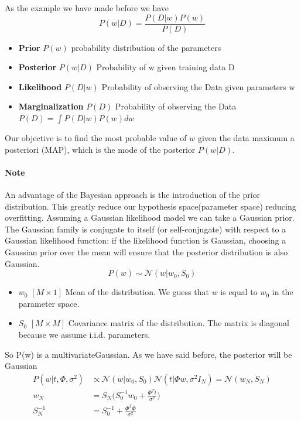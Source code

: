 \documentclass[../main.tex]{subfiles}
\begin{document}
As the example we have made before we have
\begin{equation*}
    P(w|D) = \frac{P(D|w)P(w)}{P(D)}
\end{equation*}
\begin{itemize}
    \item \textbf{Prior} $P(w)$ probability distribution of the parameters
    \item \textbf{Posterior} $P(w|D)$ Probability of w given training data D
    \item \textbf{Likelihood} $P(D|w)$ Probability of observing the Data given parameters w
    \item \textbf{Marginalization} $P(D)$ Probability of observing the Data $P(D)=\int P(D|w)P(w)dw$
\end{itemize}
Our objective is to find the most probable value of $w$ given the data maximum a
posteriori (MAP), which is the mode of the posterior $P(w|D)$.

\paragraph{Note} An advantage of the Bayesian approach is the introduction of the prior distribution. This greatly reduce our hypothesis space(parameter space) reducing overfitting.
Assuming a Gaussian likelihood model we can take a Gaussian prior.
The Gaussian family is conjugate to itself (or self-conjugate) with respect to a Gaussian likelihood function: if the likelihood function is Gaussian, choosing a Gaussian prior over the mean will ensure that the posterior distribution is also Gaussian.
\begin{equation}
    P(w) \sim \mathcal{N} (w|w_0, S_0)
\end{equation}
\begin{itemize}
    \item $w_0$ $[M \times 1]$ Mean of the distribution. We guess that $w$ is equal to $w_0$ in the parameter space.
    \item $S_0$ $[M \times M]$ Covariance matrix of the distribution. The matrix is diagonal because we assume i.i.d. parameters.
\end{itemize}
So P(w) is a multivariate\footnotemark Gaussian.
As we have said before, the posterior will be Gaussian
\begin{align*}
    P(w|t, \Phi, \sigma^2) & \propto \mathcal{N} (w|w_0, S_0) \mathcal{N} (t|\Phi w, \sigma^2I_N) = \mathcal{N} (w_N,S_N) \\
    w_N                    & = S_N \bigg( S_0^{-1}w_0 + \frac{\Phi^T t}{\sigma^2} \bigg)                                  \\
    S_N^{-1}               & = S_0^{-1} + \frac{\Phi^T \Phi}{\sigma^2}
\end{align*}
\end{document}
